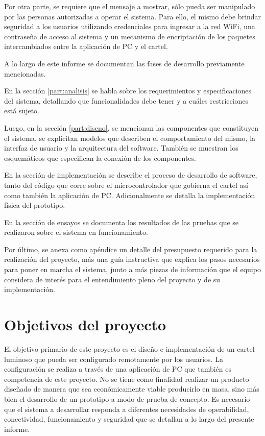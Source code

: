 Por otra parte, se requiere que el mensaje a mostrar, sólo pueda ser manipulado por las personas autorizadas a operar el sistema. Para ello, el mismo debe brindar seguridad a los usuarios utilizando credenciales para ingresar a la red WiFi, una contraseña de acceso al sistema y un mecanismo de encriptación de los paquetes intercambiados entre la aplicación de PC y el cartel.

A lo largo de este informe se documentan las fases de desarrollo previamente mencionadas.

En la sección \ref{part:analisis} se habla sobre los requerimientos y especificaciones del sistema, detallando que funcionalidades debe tener y a cuáles restricciones está sujeto.

Luego, en la sección \ref{part:diseno}, se mencionan las componentes que constituyen el sistema, se explicitan modelos que describen el comportamiento del mismo, la interfaz de usuario y la arquitectura del software. También se muestran los esquemáticos que especifican la conexión de los componentes.

En la sección de implementación se describe el proceso de desarrollo de software, tanto del código que corre sobre el microcontrolador que gobierna el cartel así como también la aplicación de PC. 
Adicionalmente se detalla la implementación física del prototipo.

En la sección de ensayos se documenta los resultados de las pruebas que se realizaron sobre el sistema en funcionamiento.

Por último, se anexa como apéndice un detalle del presupuesto requerido para la realización del proyecto, más una guía instructiva que explica los pasos necesarios para poner en marcha el sistema, junto a más piezas de información que el equipo considera de interés para el entendimiento pleno del proyecto y de su implementación.


\section{Objetivos del proyecto}
El objetivo primario de este proyecto es el diseño e implementación de un cartel luminoso que pueda ser configurado remotamente por los usuarios.
La configuración se realiza a través de una aplicación de PC que también es competencia de este proyecto. 
No se tiene como finalidad realizar un producto diseñado de manera que sea económicamente viable producirlo en masa, sino más bien el desarrollo de un prototipo a modo de prueba de concepto. 
Es necesario que el sistema a desarrollar responda a diferentes necesidades de operabilidad, conectividad, funcionamiento y seguridad que se detallan a lo largo del presente informe.

